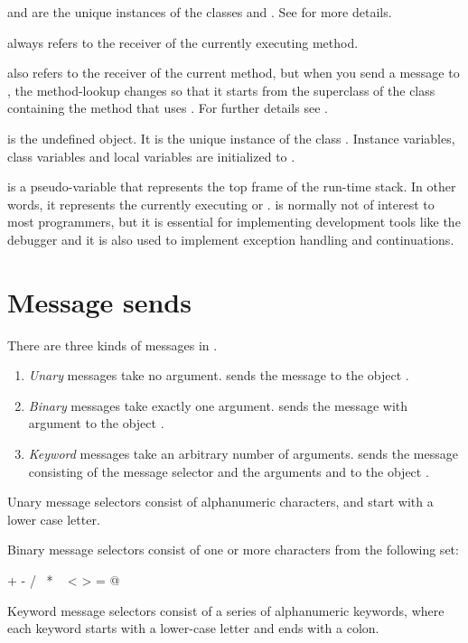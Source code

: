 \documentclass[a4paper,10pt,twoside]{book}
\begin{document}
 and  are the unique instances of the  classes  and .
See  for more details.

 always refers to the receiver of the currently executing method.

 also refers to the receiver of the current method, but when you send a message to \super, the method-lookup changes so that it starts from the superclass of the class containing the method that uses .
For further details see .

 is the undefined object.
It is the unique instance of the class . 
Instance variables, class variables and local variables are initialized to .

 is a pseudo-variable that represents the top frame of the run-time stack.
In other words, it represents the currently executing  or .
 is normally not of interest to most programmers, but it is essential for implementing development tools like the debugger and it is also used to implement exception handling and continuations.

\section{Message sends}

There are three kinds of messages in \pharo.
\begin{enumerate}
  \item \emph{Unary} messages take no argument.
   sends the message  to the object .
  \item \emph{Binary} messages take exactly one argument.
  	 sends the message \ct{+} with argument  to the object .
  \item \emph{Keyword} messages take an arbitrary number of arguments.
  	 sends the message consisting of the message selector
	 and the arguments  and  to the object .
\end{enumerate}

Unary message selectors consist of alphanumeric characters, and start with a lower case letter.

Binary message selectors consist of one or more characters from the following set:
\begin{code}{}
+ - / \ * ~ < > = @ %
\end{code}
\noindent
Keyword message selectors consist of a series of alphanumeric keywords, where each keyword starts with a lower-case letter and ends with a colon.
\end{document}
